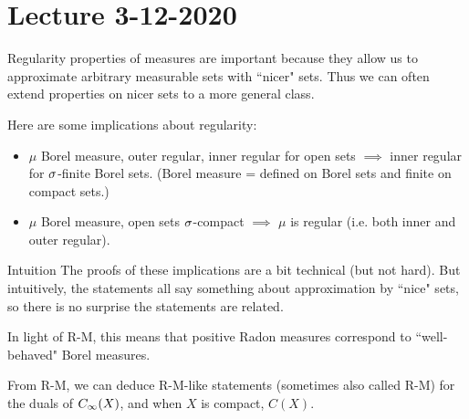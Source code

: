 \section{Lecture 3-12-2020}
Regularity properties of measures are important because they allow us to approximate arbitrary measurable sets with ``nicer" sets. Thus we can often extend properties on nicer sets to a more general class.

Here are some implications about regularity:
\begin{itemize}
    \item $\mu$ Borel measure, outer regular, inner regular for open sets $\implies$ inner regular for $\sigma$-finite Borel sets. (Borel measure = defined on Borel sets and finite on compact sets.)
    \item $\mu$ Borel measure, open sets $\sigma$-compact $\implies$ $\mu$ is regular (i.e. both inner and outer regular).
\end{itemize}
\begin{details}{Intuition}
    The proofs of these implications are a bit technical (but not hard). But intuitively, the statements all say something about approximation by ``nice" sets, so there is no surprise the statements are related.
\end{details}
In light of R-M, this means that positive Radon measures correspond to ``well-behaved" Borel measures.

From R-M, we can deduce R-M-like statements (sometimes also called R-M) for the duals of $C_\infty(X)$, and when $X$ is compact, $C(X)$.
